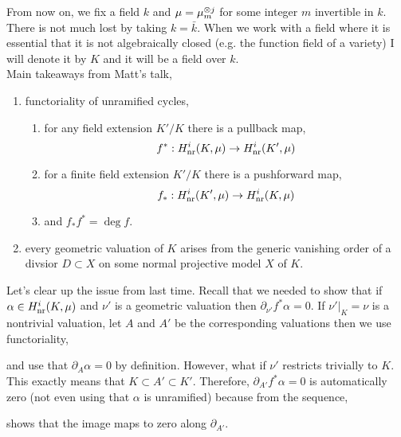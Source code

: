 \documentclass[12pt]{article}
\begin{document}
From now on, we fix a field $k$ and $\mu = \mu_m^{\otimes j}$ for some integer $m$ invertible in $k$. There is not much lost by taking $k = \bar{k}$. When we work with a field where it is essential that it is not algebraically closed (e.g. the function field of a variety) I will denote it by $K$ and it will be a field over $k$.
\bigskip\\
Main takeaways from Matt's talk,
\begin{enumerate}
\item functoriality of unramified cycles,
\begin{enumerate}
\item for any field extension $K'/K$ there is a pullback map,
\[ f^* : H^i_{\mathrm{nr}}(K, \mu) \to H^i_{\mathrm{nr}}(K', \mu) \]

\item for a finite field extension $K'/K$ there is a pushforward map,
\[ f_* : H^i_{\mathrm{nr}}(K', \mu) \to H^i_{\mathrm{nr}}(K, \mu) \]

\item and $f_* f^* = \deg{f}$.
\end{enumerate}

\item every geometric valuation of $K$ arises from the generic vanishing order of a divsior $D \subset X$ on some normal projective model $X$ of $K$.
\end{enumerate}

\begin{rmk}
Let's clear up the issue from last time. Recall that we needed to show that if $\alpha \in H^i_{\mathrm{nr}}(K, \mu)$ and $\nu'$ is a geometric valuation then $\partial_{\nu'} f^* \alpha = 0$. If $\nu'|_K = \nu$ is a nontrivial valuation, let $A$ and $A'$ be the corresponding valuations then we use functoriality,
\begin{center}
\end{center}
and use that $\partial_A \alpha = 0$ by definition. However, what if $\nu'$ restricts trivially to $K$. This exactly means that $K \subset A' \subset K'$. Therefore, $\partial_{A'} f^* \alpha = 0$ is automatically zero (not even using that $\alpha$ is unramified) because from the sequence,
\begin{center}
\end{center}
shows that the image maps to zero along $\partial_{A'}$.
\end{rmk}
\end{document}

